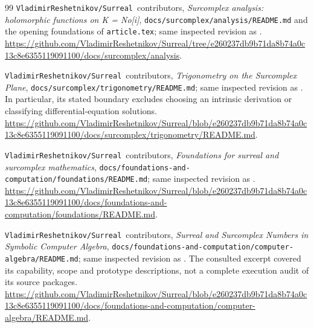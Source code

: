 \documentclass[11pt,a4paper]{article}
\numberwithin{equation}{section}
\theoremstyle{definition}
\theoremstyle{remark}
\newcommand{\repo}{\texttt{VladimirReshetnikov/Surreal}}
\newcommand{\code}[1]{\texttt{#1}}
\begin{document}
\begin{thebibliography}{99}
\repo\ contributors,
\emph{Surcomplex analysis: holomorphic functions on K = No[i]},
\code{docs/surcomplex/analysis/README.md} and the opening foundations
of \code{article.tex}; same inspected revision as \cite{RepoMap}.
\url{https://github.com/VladimirReshetnikov/Surreal/tree/e260237db9b71da8b74a0c13c8e6355119091100/docs/surcomplex/analysis}.

\repo\ contributors,
\emph{Trigonometry on the Surcomplex Plane},
\code{docs/surcomplex/trigonometry/README.md}; same inspected revision
as \cite{RepoMap}. In particular, its stated boundary excludes choosing an
intrinsic derivation or classifying differential-equation solutions.
\url{https://github.com/VladimirReshetnikov/Surreal/blob/e260237db9b71da8b74a0c13c8e6355119091100/docs/surcomplex/trigonometry/README.md}.

\repo\ contributors,
\emph{Foundations for surreal and surcomplex mathematics},
\code{docs/foundations-and-computation/foundations/README.md};
same inspected revision as \cite{RepoMap}.
\url{https://github.com/VladimirReshetnikov/Surreal/blob/e260237db9b71da8b74a0c13c8e6355119091100/docs/foundations-and-computation/foundations/README.md}.

\repo\ contributors,
\emph{Surreal and Surcomplex Numbers in Symbolic Computer Algebra},
\code{docs/foundations-and-computation/computer-algebra/README.md};
same inspected revision as \cite{RepoMap}. The consulted excerpt covered
its capability, scope and prototype descriptions, not a complete execution
audit of its source packages.
\url{https://github.com/VladimirReshetnikov/Surreal/blob/e260237db9b71da8b74a0c13c8e6355119091100/docs/foundations-and-computation/computer-algebra/README.md}.

\end{thebibliography}
\end{document}
